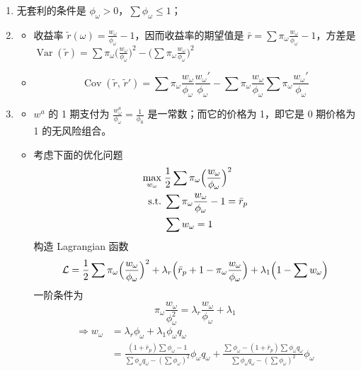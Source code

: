 \begin{solution}
\begin{enumerate}[label=(\alph*)]
    \item 无套利的条件是 $\phi_{\omega}>0$，$\sum\phi_{\omega}\le 1$；
    \item
    \begin{itemize}
        \item 收益率 $\tilde{r}(\omega)=\frac{w_{\omega}}{\phi_{\omega}}-1$，因而收益率的期望值是 $\bar{r}=\sum\pi_{\omega}\frac{w_{\omega}}{\phi_{\omega}}-1$，方差是 $\operatorname{Var}(\tilde{r})=\sum\pi_{\omega}\bigl(\frac{w_{\omega}}{\phi_{\omega}}\bigr)^{2}-\bigl(\sum\pi_{\omega}\frac{w_{\omega}}{\phi_{\omega}}\bigr)^{2}$
        \item
        \[
            \operatorname{Cov}(\tilde{r},\,\tilde{r}')=\sum\pi_{\omega}\frac{w_{\omega}}{\phi_{\omega}}\frac{w_{\omega}'}{\phi_{\omega}}-\sum\pi_{\omega}\frac{w_{\omega}}{\phi_{\omega}}\sum\pi_{\omega}\frac{w_{\omega}'}{\phi_{\omega}}
        \]
    \end{itemize}
    \item
    \begin{itemize}
        \item $w^{a}$ 的 1 期支付为 $\frac{w_{\omega}^{a}}{\phi_{\omega}}=\frac{1}{\phi_{0}}$ 是一常数；而它的价格为 1，即它是 0 期价格为 1 的无风险组合。
        \item 考虑下面的优化问题
        \[
            \begin{aligned}
                \max_{w_{\omega}}\;&\frac12\sum\pi_{\omega}\Bigl(\frac{w_{\omega}}{\phi_{\omega}}\Bigr)^{2}\\
                \text{s.t.}\;&\sum\pi_{\omega}\frac{w_{\omega}}{\phi_{\omega}}-1=\bar{r}_{p}\\
                &\sum w_{\omega}=1
            \end{aligned}
        \]
        构造 Lagrangian 函数
        \[
            \mathcal{L}=\frac12\sum\pi_{\omega}\Bigl(\frac{w_{\omega}}{\phi_{\omega}}\Bigr)^{2}+\lambda_{r}\Bigl(\bar{r}_{p}+1-\pi_{\omega}\frac{w_{\omega}}{\phi_{\omega}}\Bigr)+\lambda_{1}\Bigl(1-\sum w_{\omega}\Bigr)
        \]
        一阶条件为
        \[
            \pi_{\omega}\frac{w_{\omega}}{\phi_{\omega}^{2}}=\lambda_{r}\frac{w_{\omega}}{\phi_{\omega}}+\lambda_{1}
        \]
        \[
            \begin{aligned}
                \Rightarrow w_{\omega}&=\lambda_{r}\phi_{\omega}+\lambda_{1}\phi_{\omega}q_{\omega}\\
                &=\frac{(1+\bar{r}_{p})\sum\phi_{\omega}-1}{\sum\phi_{\omega}q_{\omega}-(\sum\phi_{\omega})^{2}}\phi_{\omega}q_{\omega}+\frac{\sum\phi_{\omega}-(1+\bar{r}_{p})\sum\phi_{\omega}q_{\omega}}{\sum\phi_{\omega}q_{\omega}-(\sum\phi_{\omega})^{2}}\phi_{\omega}\\

\end{aligned}\]
\end{itemize}
\end{enumerate}
\end{solution}
